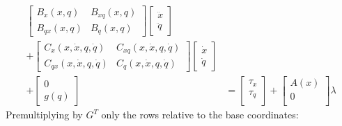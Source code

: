 \begin{equation}
\begin{split}
	\left[
	\begin{matrix}
	B_x(x,q)&B_{xq}(x,q)\\
	B_{qx}(x,q)&B_q(x,q)
	\end{matrix}\right]\left[
	\begin{matrix}
	\ddot{x}\\\ddot{q}
	\end{matrix}\right]&\\ +\left[
	\begin{matrix}
	C_x(x,\dot{x},q,\dot{q})&C_{xq}(x,\dot{x},q,\dot{q})\\
	C_{qx}(x,\dot{x},q,\dot{q})&C_q(x,\dot{x},q,\dot{q})
	\end{matrix}\right]\left[
	\begin{matrix}
	\dot{x}\\\dot{q}
	\end{matrix}\right] &\\ +\left[
	\begin{matrix}
	0\\g(q)
	\end{matrix}\right]	&= \left[
	\begin{matrix}
	\tau_x\\\tau_q\\
	\end{matrix}\right]+\left[
	\begin{matrix}
	A(x)\\0\\
	\end{matrix}\right]\lambda
\end{split}	
\end{equation}
Premultiplying by $G^T$ only the rows relative to the base coordinates:
